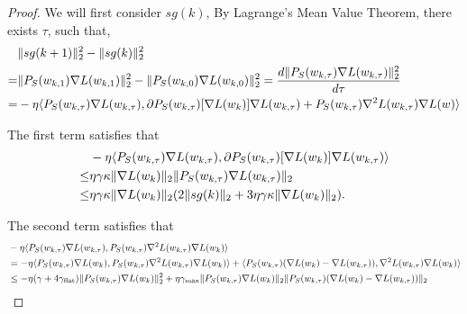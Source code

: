 \begin{proof}

    We will first consider $sg(k)$, By Lagrange's Mean Value Theorem, there exists $\tau$, such that,
    \begin{align*}
        &\| sg(k + 1) \|_2^2 - \| sg(k)\|_2^2 \\ =& 
        \| {P}_S(w_{k,1}) \nabla L(w_{k,1})\|_2^2 - \| {P}_S(w_{k,0}) \nabla L(w_{k,0})\|_2^2 = \frac{d \| {P}_S(w_{k,\tau}) \nabla L(w_{k,\tau}) \|_2^2}{d \tau} \\
        =& -\eta \langle {P}_S(w_{k,\tau}) \nabla L(w_{k,\tau}), \partial {P}_S(w_{k, \tau})[\nabla L(w_k)] \nabla L(w_{k, \tau}) + {P}_S(w_{k, \tau}) \nabla^2 L(w_{k, \tau}) \nabla L(w)\rangle
    \end{align*}

    


    The first term satisfies that
    \begin{align*}
        &-\eta \langle {P}_S(w_{k,\tau}) \nabla L(w_{k,\tau}), \partial {P}_S(w_{k, \tau})[\nabla L(w_k)] \nabla L(w_{k, \tau})\rangle \\ \le& \eta \gamma \kappa \| \nabla L(w_k)\|_2 \| {P}_S(w_{k,\tau}) \nabla L(w_{k,\tau}) \|_2  \\
        \le& \eta\gamma \kappa \| \nabla L(w_k)\|_2 ( 2\|  sg(k) \|_2 + 3\eta  \gamma \kappa \| \nabla L(w_k)\|_2).
    \end{align*}


    The second term satisfies that
    \begin{align*}
        &-\eta \langle {P}_S(w_{k,\tau}) \nabla L(w_{k,\tau}), {P}_S(w_{k, \tau}) \nabla^2 L(w_{k, \tau}) \nabla L(w_k)\rangle \\
        &= -\eta\langle {P}_S(w_{k, \tau}) \nabla L(w_k), {P}_S(w_{k, \tau}) \nabla^2 L(w_{k, \tau}) \nabla L(w_k)\rangle  + \langle {P}_S(w_{k,\tau}) (\nabla L(w_k) - \nabla L(w_{k,\tau})), \nabla^2 L(w_{k, \tau}) \nabla L(w_k)\rangle \\
        &\le -\eta (\gamma  + 4 \gamma_{\mathrm{flat}})\| {P}_S(w_{k, \tau}) \nabla L(w_k)\|_2^2  + \eta \gamma_{\mathrm{max}} \| {P}_S(w_{k, \tau}) \nabla L(w_k) \|_2 \|{P}_S(w_{k, \tau}) (\nabla L(w_k) - \nabla L(w_{k,\tau})) \|_2  
    \end{align*}


\end{proof}
